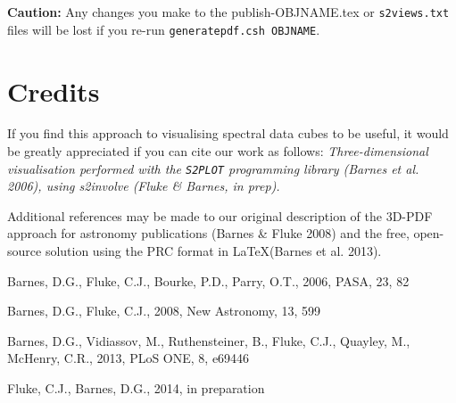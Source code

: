 \documentclass{article}
\begin{document}
{\bf Caution:} Any changes you make to the publish-OBJNAME.tex or {\tt s2views.txt} 
files will be lost if you re-run {\tt generatepdf.csh OBJNAME}.


\section*{Credits}
If you find this approach to visualising spectral data cubes to be useful, 
it would be greatly appreciated if you can cite our work as follows:
{\em Three-dimensional visualisation performed with the {\tt S2PLOT} programming 
library (Barnes et al. 2006), using {\sc s2involve} (Fluke \& Barnes, {\em in prep}).}

Additional references may be made to our original description of the 3D-PDF approach
for astronomy publications (Barnes \& Fluke 2008) and the free, open-source solution 
using the PRC format in \LaTeX (Barnes et al. 2013). 


\begin{thebibliography}{99}
Barnes, D.G., Fluke, C.J., Bourke, P.D., Parry, O.T., 2006, PASA, 23, 82

Barnes, D.G., Fluke, C.J., 2008, New Astronomy, 13, 599 

Barnes, D.G., Vidiassov, M., Ruthensteiner, B., Fluke, C.J., Quayley, M., McHenry, C.R., 2013, PLoS ONE, 8, e69446

Fluke, C.J., Barnes, D.G., 2014, in preparation

\end{thebibliography}
\end{document}
